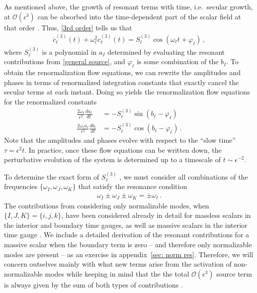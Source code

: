 \documentclass[letterpaper,11pt]{article}
\newcommand{\ol}{\omega_\ell}
\newcommand{\mc}{\mathcal}
\begin{document}
As mentioned above, the growth of resonant terms with time, i.e.~secular growth, at $\mc O(\epsilon^3)$ can be absorbed into the time-dependent part of the scalar field at that order \cite{hep-th/9506161}. Thus, \eqref{3rd order} tells us that
\begin{align}
\ddot c^{(3)}_\ell (t) + \ol^2 c^{(3)}_\ell(t) = S^{(3)}_\ell \cos \left( \ol t + \varphi_\ell \right) \, ,
\end{align}
where $S^{(3)}_\ell$ is a polynomial in $a_I$ determined by evaluating the resonant contributions from \eqref{general source}, and $\varphi_\ell$ is some combination of the $b_I$. To obtain the renormalization flow equations, we can rewrite the amplitudes and phases in terms of renormalized integration constants that exactly cancel the secular terms at each instant. Doing so yields the renormalization flow equations for the renormalized constants~\cite{1407.6273}
\begin{align}
\label{RN flow 1}
\frac{2 \ol}{\epsilon^2} \frac{d a_\ell}{d t} &= - S^{(3)}_\ell \sin \left( b_\ell - \varphi_\ell \right) \\
\label{RN flow 2}
\frac{2 \ol a_\ell}{\epsilon^2} \frac{d b_\ell}{d t} &= - S^{(3)}_\ell \cos \left( b_\ell - \varphi_\ell \right) \, .
\end{align}
Note that the amplitudes and phases evolve with respect to the ``slow time'' $\tau = \epsilon^2 t$. In practice, once these flow equations can be written down, the perturbative evolution of the system is determined up to a timescale of $t \sim \epsilon^{-2}$.

To determine the exact form of $S^{(3)}_\ell\!\!\!$ , we must consider all combinations of the frequencies ${\{ \omega_I, \omega_J, \omega_K\}}$ that satisfy the resonance condition
\begin{align}
\label{gen res}
\omega_I \pm \omega_J \pm \omega_K = \pm \ol \, .
\end{align}
The contributions from considering only normalizable modes, when $\{ I, J, K \} = \{i, j ,k\}$,
have been considered already in detail for massless scalars in the interior \cite{1407.6273} 
and boundary \cite{1412.3249} time gauges, as well as massive scalars in the interior time gauge \cite{1810.04753}.
We include a detailed derivation of the resonant contributions for a massive scalar when the boundary term is 
zero -- and therefore only normalizable modes are present -- as an exercise in appendix~\ref{sec: norm res}. 
Therefore, we will concern outselves mainly with what new terms arise from the activation of non-normalizable 
modes while keeping in mind that the the total $\mc O(\epsilon^3)$ source term is always given 
by the sum of both types of contributions \cite{1810.04753}.
\end{document}
